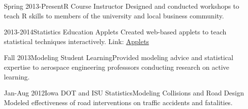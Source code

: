 \documentclass[10pt]{tccv}
\begin{document}
\begin{eventlist}
\item{Spring 2013-Present}{\phantom{ISU}}{R Course Instructor\vspace{-14pt}}{
Designed and conducted workshops to teach R skills to members of the university and local business community. 
}

\item{2013-2014}{\phantom{ISU}}{Statistics Education Applets\vspace{-14pt}}{
Created web-based applets to teach statistical techniques interactively. 
Link: \href{http://vanderplas.dyndns-remote.com:3838/}{Applets}}

\item{Fall 2013}{\phantom{ISU}}{Modeling Student Learning\vspace{-14pt}}{Provided modeling advice and statistical expertise to aerospace engineering professsors conducting research on active learning.}



\item{Jan-Aug 2012}{Iowa DOT and ISU Statistics}{Modeling Collisions and Road Design}{
Modeled effectiveness of road interventions on traffic accidents and fatalities. 
}


\end{eventlist}
\end{document}
